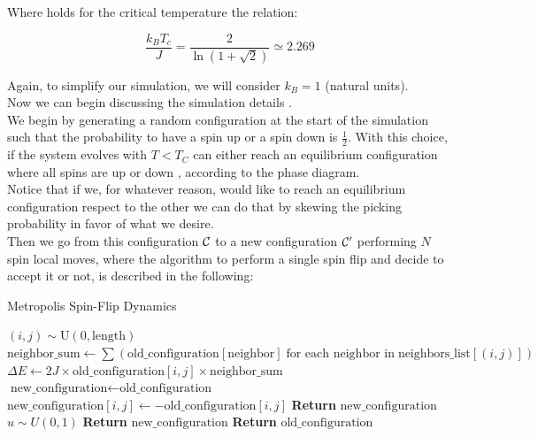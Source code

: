 Where holds for the critical temperature the relation:

$$ \frac{k_BT_c}{J} = \frac{2}{\ln(1 +\sqrt{2})} \simeq 2.269 $$

Again, to simplify our simulation, we will consider $k_B = 1$ (natural units). \\

Now we can begin discussing the simulation details .\\
We begin by generating a random configuration at the start of the simulation such that the probability to have a spin up or a spin down is
$\frac{1}{2}$. With this choice, if the system evolves with $T<T_C$ can either reach an equilibrium configuration where all spins are up or down ,
according to the phase diagram. \\
Notice that if we, for whatever reason, would like to reach an equilibrium configuration respect to the other we can do that by skewing
the picking probability in favor of what we desire. \\
Then we go from this configuration $\mathcal{C}$ to a new configuration $\mathcal{C}'$ performing $N$ spin local moves, 
where the algorithm to perform a single spin flip and decide to accept it or not, is described in the following:

\begin{algorithm}
    \caption{Metropolis Spin-Flip Dynamics}
    \begin{algorithmic}[1]
        \State \((i, j) \sim \text{U}(0, \text{length})\)
        \State \(\text{neighbor\_sum} \gets \sum \left( \text{old\_configuration}[\text{neighbor}] \; \text{for each neighbor in} \; \text{neighbors\_list}[(i, j)] \right)\)
        \State \(\Delta E \gets 2J \times \text{old\_configuration}[i, j] \times \text{neighbor\_sum}\)
        \State \(\text{new\_configuration} \gets \text{old\_configuration}\)
        \State \(\text{new\_configuration}[i, j] \gets -\text{old\_configuration}[i, j]\) 
            \State \textbf{Return} \(\text{new\_configuration}\)
        \Else
            \State \(u \sim U(0,1)\)
                \State \textbf{Return} \(\text{new\_configuration}\)
            \Else
                \State \textbf{Return} \(\text{old\_configuration}\)
            \EndIf
        \EndIf
    \end{algorithmic}
    \label{metropolis_spin_flip}
\end{algorithm}

